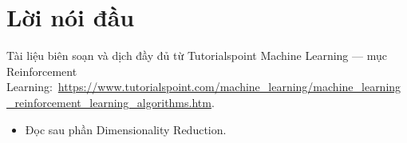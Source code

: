 \documentclass[12pt,a4paper]{article}
\newcommand{\tsurl}[1]{\url{#1}}
\begin{document}

\newpage
\tableofcontents
\newpage

\section*{Lời nói đầu}

\begin{ynghia}[title={Nguồn}]
Tài liệu biên soạn và dịch đầy đủ từ Tutorialspoint Machine Learning --- mục Reinforcement Learning:\ \tsurl{https://www.tutorialspoint.com/machine_learning/machine_learning_reinforcement_learning_algorithms.htm}.
\end{ynghia}

\begin{phuongphap}[title={Cách dùng}]
\begin{itemize}
  \item Đọc sau phần Dimensionality Reduction.
\end{itemize}
\end{phuongphap}

\newpage









\end{document}
